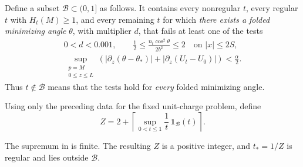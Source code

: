 Define a subset \(\mathcal B\subset(0,1]\) as follows.
It contains every nonregular \(t\), every regular \(t\) with
\(H_t(M)\ge1\), and every remaining \(t\) for which \emph{there
exists a folded minimizing angle} \(\theta\), with multiplier \(d\),
that fails at least one of the tests
\begin{equation}
 \begin{gathered}
 0<d<0.001,\qquad
 \frac12\le\frac{n_t\cos^2\theta}{2b^2}\le2
       \quad\text{on } |x|\le2S,\\
 \sup_{\substack{p=M\\0\le z\le L}}
 \left(
   |\partial_z(\theta-\theta_*)|
   +|\partial_z(U_t-U_0)|
 \right)<\frac{\alpha}{2}.
 \end{gathered}
 \label{eq:parameter-angle-tests}
\end{equation}
Thus \(t\notin\mathcal B\) means that the tests hold for
\emph{every} folded minimizing angle.

\begin{definition}
\label{def:explicit-charge}
Using only the preceding data for the fixed unit-charge problem,
define
\begin{equation}
 Z=2+\left\lceil
       \sup_{0<t\le1}\frac1t\,\mathbf1_{\mathcal B}(t)
      \right\rceil .
 \label{eq:explicit-charge}
\end{equation}
\end{definition}

\begin{lemma}
\label{lem:explicit-charge-finite}
The supremum in  is finite.  The resulting
\(Z\) is a positive integer, and \(t_*=1/Z\) is regular and lies
outside \(\mathcal B\).
\end{lemma}

